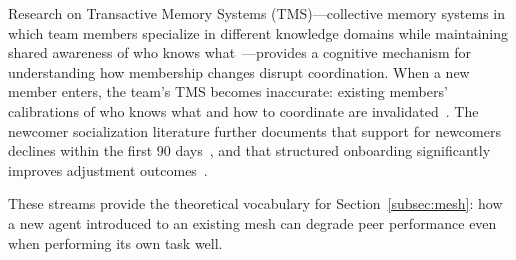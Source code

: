 Research on Transactive Memory Systems (TMS)---collective memory systems in
which team members specialize in different knowledge domains while maintaining
shared awareness of who knows
what~\cite{wegner1987transactive,lewis2007group,ren2011transactive,liang1995group,moreland2003transactive}---provides
a cognitive mechanism for understanding how membership changes disrupt
coordination. When a new member enters, the team's TMS becomes inaccurate:
existing members' calibrations of who knows what and how to coordinate are
invalidated~\cite{lewis2007group,wegner1987transactive}. The newcomer
socialization literature further documents that support for newcomers declines
within the first 90 days~\cite{kammeyer2013support}, and that structured
onboarding significantly improves adjustment outcomes~\cite{bauer2025newcomer}.

These streams provide the theoretical vocabulary for
Section~\ref{subsec:mesh}: how a new agent introduced to an existing mesh can
degrade peer performance even when performing its own task well.
